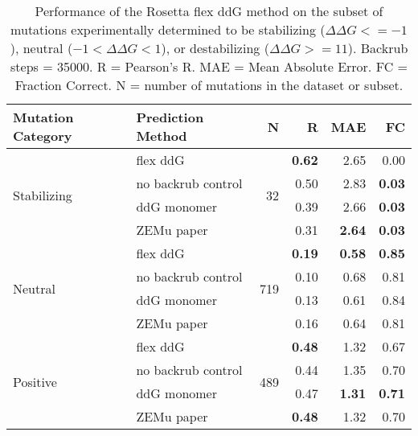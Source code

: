 \begin{table}
  \begin{tabular}{llrrrr}
\toprule
Mutation Category &   Prediction Method &    N &    R &  MAE &   FC \\
\midrule
 \multirow{ 4}{*}{Stabilizing} & flex ddG & \multirow{ 4}{*}{32} & \textbf{0.62} & 2.65 & 0.00  \\
 & no backrub control & & 0.50 & 2.83 & \textbf{0.03}  \\
 & ddG monomer & & 0.39 & 2.66 & \textbf{0.03}  \\
 & ZEMu paper & & 0.31 & \textbf{2.64} & \textbf{0.03}  \\
\hline
 \multirow{ 4}{*}{Neutral} & flex ddG & \multirow{ 4}{*}{719} & \textbf{0.19} & \textbf{0.58} & \textbf{0.85}  \\
 & no backrub control & & 0.10 & 0.68 & 0.81  \\
 & ddG monomer & & 0.13 & 0.61 & 0.84  \\
 & ZEMu paper & & 0.16 & 0.64 & 0.81  \\
\hline
 \multirow{ 4}{*}{Positive} & flex ddG & \multirow{ 4}{*}{489} & \textbf{0.48} & 1.32 & 0.67  \\
 & no backrub control & & 0.44 & 1.35 & 0.70  \\
 & ddG monomer & & 0.47 & \textbf{1.31} & \textbf{0.71}  \\
 & ZEMu paper & & \textbf{0.48} & 1.32 & 0.70  \\
\bottomrule
\end{tabular}
  \caption[Flex ddG performance on stabilizing mutations]{
    Performance of the Rosetta flex ddG method on the subset of mutations experimentally determined to be stabilizing ($\Delta\Delta G <= -1$), neutral ($-1 < \Delta\Delta G < 1$), or destabilizing ($\Delta\Delta G >= 11$). Backrub steps = 35000. R = Pearson's R. MAE = Mean Absolute Error. FC = Fraction Correct. N = number of mutations in the dataset or subset.
  } \label{tab:table-stabilizing}
\end{table}
